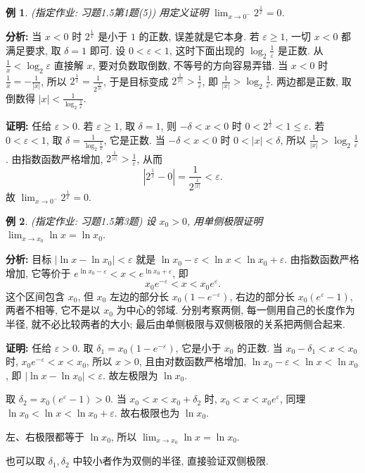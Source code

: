 \documentclass[UTF8,openany]{ctexbook}
\theoremstyle{chinesetextbook}
\newtheorem{example}{例}[section]
\newenvironment{cnproof}{\par\indent\textbf{证明:} \ignorespaces}{\par}
\begin{document}
\begin{example}\label{ex:h15-1-5}
\textnormal{(指定作业: 习题1.5第1题(5))} 用定义证明 $\displaystyle\lim_{x\to0^-}2^{\frac1x}=0$.
\end{example}
\par\indent\textbf{分析:} 当 $x<0$ 时 $2^{\frac1x}$ 是小于 $1$ 的正数, 误差就是它本身. 若 $\varepsilon\ge1$, 一切 $x<0$ 都满足要求, 取 $\delta=1$ 即可. 设 $0<\varepsilon<1$, 这时下面出现的 $\displaystyle\log_2\frac1\varepsilon$ 是正数. 从 $\displaystyle\frac1x<\log_2\varepsilon$ 直接解 $x$, 要对负数取倒数, 不等号的方向容易弄错. 当 $x<0$ 时 $\displaystyle\frac1x=-\frac1{|x|}$, 所以 $\displaystyle2^{\frac1x}=\frac1{2^{\frac1{|x|}}}$, 于是目标变成 $\displaystyle2^{\frac1{|x|}}>\frac1\varepsilon$, 即 $\displaystyle\frac1{|x|}>\log_2\frac1\varepsilon$. 两边都是正数, 取倒数得 $\displaystyle|x|<\frac1{\log_2\frac1\varepsilon}$.
\begin{cnproof}
任给 $\varepsilon>0$. 若 $\varepsilon\ge1$, 取 $\delta=1$, 则 $-\delta<x<0$ 时 $0<2^{\frac1x}<1\le\varepsilon$. 若 $0<\varepsilon<1$, 取 $\displaystyle\delta=\frac1{\log_2\frac1\varepsilon}$, 它是正数. 当 $-\delta<x<0$ 时 $0<|x|<\delta$, 所以 $\displaystyle\frac1{|x|}>\log_2\frac1\varepsilon$. 由指数函数严格增加, $\displaystyle2^{\frac1{|x|}}>\frac1\varepsilon$, 从而
\[
\left|2^{\frac1x}-0\right|=\frac1{2^{\frac1{|x|}}}<\varepsilon.
\]
故 $\displaystyle\lim_{x\to0^-}2^{\frac1x}=0$.
\end{cnproof}
\begin{example}\label{ex:h15-3}
\textnormal{(指定作业: 习题1.5第3题)} 设 $x_0>0$, 用单侧极限证明 $\displaystyle\lim_{x\to x_0}\ln x=\ln x_0$.
\end{example}
\par\indent\textbf{分析:} 目标 $|\ln x-\ln x_0|<\varepsilon$ 就是 $\ln x_0-\varepsilon<\ln x<\ln x_0+\varepsilon$. 由指数函数严格增加, 它等价于 $e^{\ln x_0-\varepsilon}<x<e^{\ln x_0+\varepsilon}$, 即
\[
x_0e^{-\varepsilon}<x<x_0e^{\varepsilon}.
\]
这个区间包含 $x_0$, 但 $x_0$ 左边的部分长 $x_0(1-e^{-\varepsilon})$, 右边的部分长 $x_0(e^\varepsilon-1)$, 两者不相等, 它不是以 $x_0$ 为中心的邻域. 分别考察两侧, 每一侧用自己的长度作为半径, 就不必比较两者的大小; 最后由单侧极限与双侧极限的关系把两侧合起来.
\begin{cnproof}
任给 $\varepsilon>0$. 取 $\delta_1=x_0(1-e^{-\varepsilon})$, 它是小于 $x_0$ 的正数. 当 $x_0-\delta_1<x<x_0$ 时, $x_0e^{-\varepsilon}<x<x_0$, 所以 $x>0$, 且由对数函数严格增加, $\ln x_0-\varepsilon<\ln x<\ln x_0$, 即 $|\ln x-\ln x_0|<\varepsilon$. 故左极限为 $\ln x_0$.

取 $\delta_2=x_0(e^{\varepsilon}-1)>0$. 当 $x_0<x<x_0+\delta_2$ 时, $x_0<x<x_0e^{\varepsilon}$, 同理 $\ln x_0<\ln x<\ln x_0+\varepsilon$. 故右极限也为 $\ln x_0$.

左、右极限都等于 $\ln x_0$, 所以 $\displaystyle\lim_{x\to x_0}\ln x=\ln x_0$.
\end{cnproof}
也可以取 $\delta_1,\delta_2$ 中较小者作为双侧的半径, 直接验证双侧极限.
\end{document}
